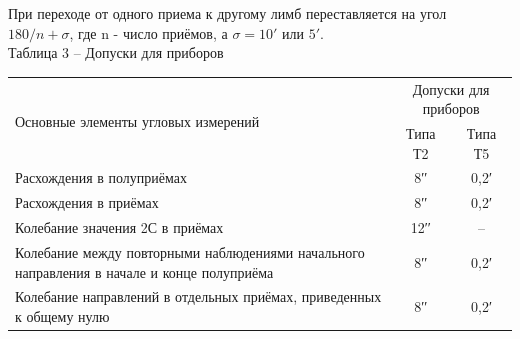 \documentclass[a4paper]{article}
\begin{document}
\begin{newpage}
{        \par При переходе от одного приема к другому лимб переставляется на угол $180/n + \sigma$, где n - число приёмов, а $\sigma = 10′$ или $5′$.\\
        
        Таблица 3 – Допуски для приборов
        \begin{center}
            \normalsize{
                \begin{tabular}{|p{280pt}|c|c|}
                    \hline
                    \multirow{2}{*}{Основные элементы угловых измерений} & \multicolumn{2}{c|}{Допуски для приборов}\\
                    \cline{2-3}
                    & Типа Т2 & Типа Т5\\
                    \hline
                    Расхождения в полуприёмах & 8′′ & 0,2′\\
                    \hline
                    Расхождения в приёмах & 8′′ & 0,2′\\
                    \hline
                    Колебание значения 2С в приёмах & 12′′ & –\\
                    \hline
                    Колебание между повторными наблюдениями начального направления в начале и конце полуприёма & 8′′ & 0,2′\\
                    \hline
                    Колебание направлений в отдельных приёмах, приведенных к общему нулю & 8′′ & 0,2′\\
                    \hline
                \end{tabular}
            }
        \end{center}
        
}
\end{newpage}
\end{document}
